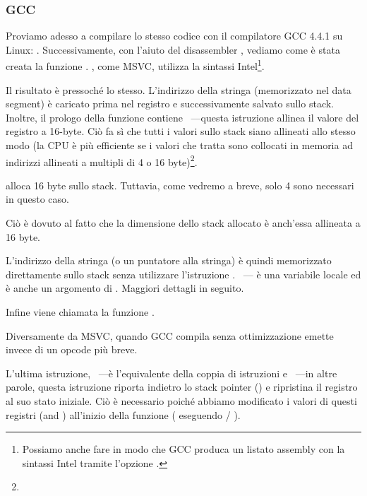 \subsubsection{GCC}

Proviamo adesso a compilare lo stesso codice \CCpp con il compilatore GCC 4.4.1 su Linux: .
Successivamente, con l'aiuto del disassembler \IDA, vediamo come è stata creata la funzione \main .
\IDA, come MSVC, utilizza la sintassi Intel\footnote{Possiamo anche fare in modo che GCC produca un listato assembly con la sintassi Intel tramite l'opzione .}.



Il risultato è pressoché lo stesso.
L'indirizzo della stringa  (memorizzato nel data segment) è caricato prima nel registro \EAX e successivamente salvato sullo stack.
Inoltre, il prologo della funzione contiene ~---questa
istruzione allinea il valore del registro \ESP a 16-byte.
Ciò fa sì che tutti i valori sullo stack siano allineati allo stesso modo (la CPU è più efficiente se i valori che tratta sono collocati in memoria ad indirizzi allineati a multipli di 4 o 16 byte)\footnote{\URLWPDA}.

 alloca 16 byte sullo stack. Tuttavia, come vedremo a breve, solo 4 sono necessari in questo caso.

Ciò è dovuto al fatto che la dimensione dello stack allocato è anch'essa allineata a 16 byte.

L'indirizzo della stringa (o un puntatore alla stringa) è quindi memorizzato direttamente sullo stack senza utilizzare l'istruzione \PUSH .
~--- è una variabile locale ed è anche un argomento di \printf{}.
Maggiori dettagli in seguito.

Infine viene chiamata la funzione \printf.

Diversamente da MSVC, quando GCC compila senza ottimizzazione emette  invece di un opcode più breve.

L'ultima istruzione, \LEAVE~---è l'equivalente della coppia di istruzioni  e  ~---in altre parole, questa istruzione riporta indietro lo \gls{stack pointer} (\ESP) e ripristina il registro \EBP al suo stato iniziale.
Ciò è necessario poiché abbiamo modificato i valori di questi registri (\ESP and \EBP) all'inizio della funzione ( eseguendo  / ).

